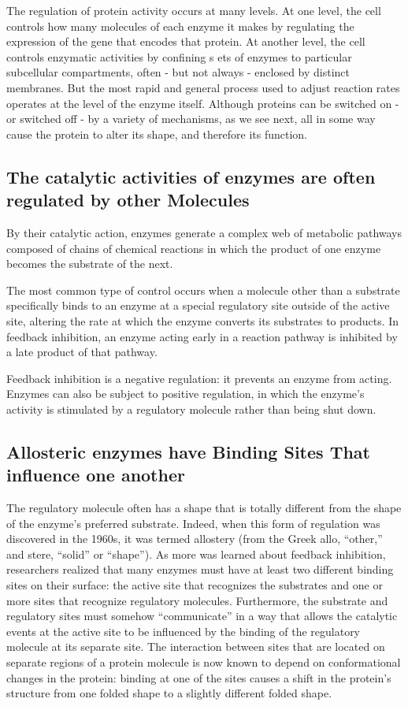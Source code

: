 The regulation of protein activity occurs at many levels. At one level, the
cell controls how many molecules of each enzyme it makes by regulating 
the expression of the gene that encodes that protein.
At another level, the cell controls enzymatic activities by confining s
ets of enzymes to particular subcellular compartments, often - but
not always - enclosed by distinct membranes.
But the most rapid and general process used to adjust reaction
rates operates at the level of the enzyme itself. Although proteins can be
switched on - or switched off - by a variety of mechanisms, as we see
next, all in some way cause the protein to alter its shape, and therefore
its function.

\subsection{The catalytic activities of enzymes are often regulated by other Molecules}

By their catalytic action, enzymes generate a complex web of metabolic pathways 
composed of chains of chemical reactions in which the product of
one enzyme becomes the substrate of the next.

The most common type of control occurs when a molecule other than a
substrate specifically binds to an enzyme at a special regulatory site outside 
of the active site, altering the rate at which the enzyme converts its
substrates to products. In feedback inhibition, an enzyme acting early in
a reaction pathway is inhibited by a late product of that pathway.

Feedback inhibition is a negative regulation: it prevents an enzyme from
acting. Enzymes can also be subject to positive regulation, in which the
enzyme’s activity is stimulated by a regulatory molecule rather than being
shut down.

\subsection{Allosteric enzymes have Binding Sites That influence one another}

The regulatory molecule often has a shape that is totally
different from the shape of the enzyme’s preferred substrate. Indeed,
when this form of regulation was discovered in the 1960s, it was termed
allostery (from the Greek allo, “other,” and stere, “solid” or “shape”). As
more was learned about feedback inhibition, researchers realized that
many enzymes must have at least two different binding sites on their
surface: the active site that recognizes the substrates and one or more
sites that recognize regulatory molecules. Furthermore, the substrate and
regulatory sites must somehow “communicate” in a way that allows the
catalytic events at the active site to be influenced by the binding of the
regulatory molecule at its separate site.
The interaction between sites that are located on separate regions of a
protein molecule is now known to depend on conformational changes
in the protein: binding at one of the sites causes a shift in the protein’s
structure from one folded shape to a slightly different folded shape.


